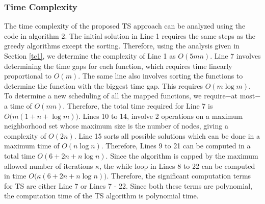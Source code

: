 \documentclass[conference]{IEEEtran}
\begin{document}
\subsubsection{Time Complexity}
The time complexity of the proposed TS approach can be analyzed using the code in algorithm 2. The initial solution in Line 1 requires the same steps as the greedy algorithms except the sorting. Therefore, using the analysis given in Section \ref{tc1}, we determine the complexity of Line 1 as $O(5mn)$. Line 7 involves determining the time gaps for each function, which requires time linearly proportional to $O(m)$. The same line also involves sorting the functions to determine the function with the biggest time gap. This requires $O(m \log m)$. To determine a new scheduling of all the mapped functions, we require$-$at most$-$a time of $O(mn)$. Therefore, the total time required for Line 7 is $O\big(m(1+n+ \log m)\big)$. Lines 10 to 14, involve 2 operations on a maximum neighborhood set whose maximum size is the number of nodes, giving a complexity of $O(2n)$. Line 15 sorts all possible solutions which can be done in a maximum time of $O(n \log n)$. Therefore, Lines 9 to 21 can be computed in a total time $O(6 + 2n + n \log n)$. Since the algorithm is capped by the maximum allowed number of iterations $\kappa$, the while loop in Lines 8 to 22 can be computed in time $O\big(\kappa(6 + 2n + n \log n)\big)$. Therefore, the significant computation terms for TS are either Line 7 or Lines 7 - 22. Since both these terms are polynomial, the computation time of the TS algorithm is polynomial time.

\begin{table*}[htb]
\begin{minipage}{1\textwidth}
\caption {Definition of Parameters and Variables for the \ac{MILP} Formulation}
\renewcommand{\arraystretch}{1.7}
\small
\centering
{}
\label{variabley}
\end{minipage}
\end{table*}
\end{document}
